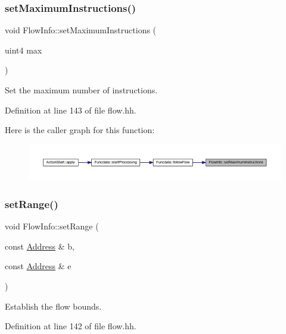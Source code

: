 \subsubsection{\texorpdfstring{setMaximumInstructions()}{setMaximumInstructions()}}
{\footnotesize\ttfamily void Flow\+Info\+::set\+Maximum\+Instructions (\begin{DoxyParamCaption}\item[{uint4}]{max }\end{DoxyParamCaption})\hspace{0.3cm}{\ttfamily [inline]}}



Set the maximum number of instructions. 



Definition at line 143 of file flow.\+hh.

Here is the caller graph for this function\+:
\nopagebreak
\begin{figure}[H]
\begin{center}
\leavevmode
\includegraphics[width=350pt]{class_flow_info_a2c8d88b187068f322a2bd8717c0e0ead_icgraph}
\end{center}
\end{figure}
\mbox{\label{class_flow_info_a4d268b911548180e9b86f4551d306477}} 
\subsubsection{\texorpdfstring{setRange()}{setRange()}}
{\footnotesize\ttfamily void Flow\+Info\+::set\+Range (\begin{DoxyParamCaption}\item[{const \mbox{\hyperlink{class_address}{Address}} \&}]{b,  }\item[{const \mbox{\hyperlink{class_address}{Address}} \&}]{e }\end{DoxyParamCaption})\hspace{0.3cm}{\ttfamily [inline]}}



Establish the flow bounds. 



Definition at line 142 of file flow.\+hh.

